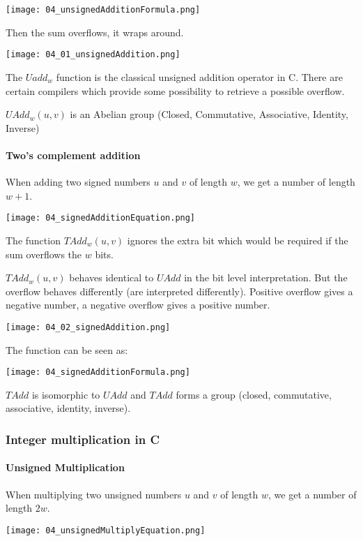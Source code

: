 \texttt{[image: 04\_unsignedAdditionFormula.png]}

Then the sum overflows, it wraps around.

\texttt{[image: 04\_01\_unsignedAddition.png]}

The $Uadd_w$ function is the classical unsigned addition operator in C. There are certain compilers which provide some possibility to retrieve a possible overflow.

$UAdd_w(u,v)$ is an Abelian group (Closed, Commutative, Associative, Identity, Inverse)

\paragraph{Two's complement addition}
When adding two signed numbers $u$ and $v$ of length $w$, we get a number of length $w + 1$.

\texttt{[image: 04\_signedAdditionEquation.png]}

The function $TAdd_w(u,v)$ ignores the extra bit which would be required if the sum overflows the $w$ bits.

$TAdd_w(u,v)$ behaves identical to $UAdd$ in the bit level interpretation. But the overflow behaves differently (are interpreted differently). Positive overflow gives a negative number, a negative overflow gives a positive number.

\texttt{[image: 04\_02\_signedAddition.png]}

The function can be seen as:

\texttt{[image: 04\_signedAdditionFormula.png]}

$TAdd$ is isomorphic to $UAdd$ and $TAdd$ forms a group (closed, commutative, associative, identity, inverse).

\subsubsection{Integer multiplication in C}

\paragraph{Unsigned Multiplication}
When multiplying two unsigned numbers $u$ and $v$ of length $w$, we get a number of length $2w$.

\texttt{[image: 04\_unsignedMultiplyEquation.png]}

